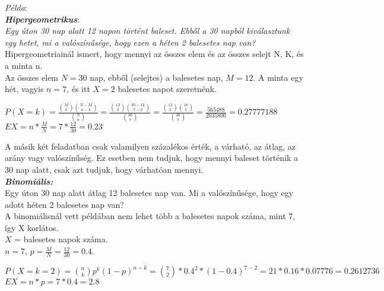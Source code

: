 \documentclass[tikz,12pt,margin=0px]{article}
\newcommand\ddfrac[2]{\frac{\displaystyle #1}{\displaystyle #2}}
\begin{document}
    \noindent \emph{Példa}:\\ 
    
    \noindent \textbf{\emph{Hipergeometrikus}}:\\
    
    \noindent \emph{Egy úton 30 nap alatt 12 napon történt baleset. Ebből a 30 napból kiválasztunk egy hetet, mi a valószínűsége, hogy ezen a héten 2 balesetes nap van?}\\
    
    \noindent Hipergeometriainál ismert, hogy mennyi az összes elem és az összes selejt N, K, és a minta n.\\
    \noindent Az összes elem $N = 30$ nap, ebből (selejtes) a balesetes nap, $M = 12$. A minta egy hét, vagyis $n = 7$, és itt $X = 2$ balesetes napot szeretnénk.\\

    \begin{center}
        $P(X=k) = \ddfrac{{M \choose k}{N-M \choose n-k}}{{N \choose n}} = \ddfrac{{12 \choose 2}{30-12 \choose 7-2}}{{30 \choose 7}} = \ddfrac{{12 \choose 2}{18 \choose 5}}{{30 \choose 7}} = \ddfrac{565488}{2035800} = 0.27777188$\\
        $EX = n * \ddfrac{M}{N} = 7 * \ddfrac{12}{30} = 0.23^{.}$
    \end{center}
    
    \noindent A másik két feladatban csak valamilyen százalékos érték, a várható, az átlag, az arány vagy valószínűség. Ez esetben nem tudjuk, hogy mennyi baleset történik a 30 nap alatt, csak azt tudjuk, hogy várhatóan mennyi.\\
    
    \noindent \textbf{\emph{Binomiális:}}\\
    Egy úton 30 nap alatt átlag 12 balesetes nap van. Mi a valószínűsége, hogy egy adott héten 2 balesetes nap van?\\

    \noindent A binomiálisnál vett példában nem lehet több a balesetes napok száma, mint 7, így X korlátos.\\
    $X$ = balesetes napok száma.\\
    $n = 7$, $p = \ddfrac{M}{N} = \ddfrac{12}{30} = 0.4$.\\
    
    \begin{center}
        $P(X = k = 2) = {n \choose k}p^{k}(1-p)^{n-k} = {7 \choose 2}*0.4^{2}*(1 - 0.4)^{7-2} = 21*0.16*0.07776 = 0.2612736$
        $EX = n * p = 7 * 0.4 = 2.8$
    \end{center}
    
\end{document}
